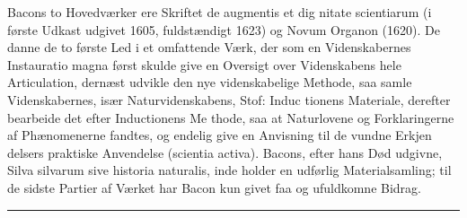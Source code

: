 \documentclass[12pt,a4paper]{book}
\newcommand{\divrule}{\begin{center}\rule{2cm}{0.4pt}\end{center}}
\begin{document}
Bacons to Hovedværker ere Skriftet de augmentis et dig\-%
nitate scientiarum (i første Udkast udgivet 1605, fuldstændigt
1623) og Novum Organon (1620). De danne de to første Led
i et omfattende Værk, der som en Videnskabernes Instauratio
magna først skulde give en Oversigt over Videnskabens hele
Articulation, dernæst udvikle den nye videnskabelige Methode,
saa samle Videnskabernes, især Naturvidenskabens, Stof: Induc\-%
tionens Materiale, derefter bearbeide det efter Inductionens Me\-%
thode, saa at Naturlovene og Forklaringerne af Phænomenerne
fandtes, og endelig give en Anvisning til de vundne Erkjen\-%
delsers praktiske Anvendelse (scientia activa). Bacons, efter
hans Død udgivne, Silva silvarum sive historia naturalis, inde\-%
holder en udførlig Materialsamling; til de sidste Partier af
Værket har Bacon kun givet faa og ufuldkomne Bidrag.

\divrule
\end{document}
